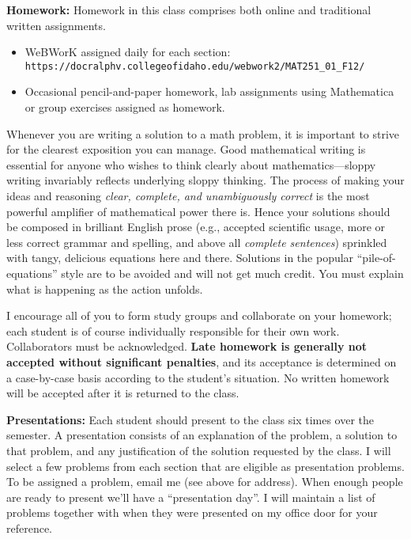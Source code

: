 \documentclass[12pt,twoside]{amsart}
\begin{document}
\newpage

\textbf{Homework:} Homework in this class comprises both online and traditional written assignments.
\begin{itemize}
    \item WeBWorK assigned daily for each section: \verb]https://docralphv.collegeofidaho.edu/webwork2/MAT251_01_F12/]
    \item Occasional pencil-and-paper homework, lab assignments using Mathematica or group exercises assigned as homework.
\end{itemize}
Whenever you are writing a solution to a math problem, it is important to strive for the clearest exposition you can manage. Good mathematical writing is essential for anyone who wishes to think clearly about mathematics---sloppy writing invariably reflects underlying sloppy thinking. The process of making your ideas and reasoning \emph{clear, complete, and unambiguously correct} is the most powerful amplifier of mathematical power there is. Hence your solutions should be composed in brilliant English prose (e.g., accepted scientific usage, more or less correct grammar and spelling, and above all \emph{complete sentences}) sprinkled with tangy, delicious equations here and there. Solutions in the popular ``pile-of-equations'' style are to be avoided and will not get much credit. You must explain what is happening as the action unfolds.

I encourage all of you to form study groups and collaborate on your homework; each student is of course individually responsible for their own work. Collaborators must be acknowledged. \textbf{Late homework is generally not accepted without significant penalties}, and its acceptance is determined on a case-by-case basis according to the student's situation. No written homework will be accepted after it is returned to the class.

\textbf{Presentations:} Each student should present to the class six times over the semester. A presentation consists of an explanation of the problem, a solution to that problem, and any justification of the solution requested by the class. I will select a few problems from each section that are eligible as presentation problems. To be assigned a problem, email me (see above for address). When enough people are ready to present we'll have a ``presentation day''. I will maintain a list of problems together with when they were presented on my office door for your reference.
\end{document}
